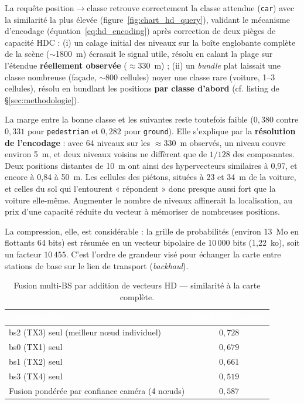 \documentclass[12pt,a4paper,titlepage]{article}
\newcommand{\hd}[1]{\textcolor{white}{\textbf{#1}}}
\begin{document}
La requête position$\to$classe retrouve correctement la classe attendue (\texttt{car}) avec la similarité la plus élevée (figure~\ref{fig:chart_hd_query}), validant le mécanisme d'encodage (équation~\eqref{eq:hd_encoding}) après correction de deux pièges de capacité HDC : (i) un calage initial des niveaux sur la boîte englobante complète de la scène ($\sim$1800~m) écrasait le signal utile, résolu en calant la plage sur l'étendue \textbf{réellement observée} ($\approx$330~m) ; (ii) un \textit{bundle} plat laissait une classe nombreuse (façade, $\sim$800 cellules) noyer une classe rare (voiture, 1--3 cellules), résolu en bundlant les positions \textbf{par classe d'abord} (cf. listing de \S\ref{sec:methodologie}).

La marge entre la bonne classe et les suivantes reste toutefois faible ($0{,}380$ contre $0{,}331$ pour \texttt{pedestrian} et $0{,}282$ pour \texttt{ground}). Elle s'explique par la \textbf{résolution de l'encodage} : avec 64 niveaux sur les $\approx 330$~m observés, un niveau couvre environ 5~m, et deux niveaux voisins ne diffèrent que de $1/128$ des composantes. Deux positions distantes de 10~m ont ainsi des hypervecteurs similaires à 0,97, et encore à 0,84 à 50~m. Les cellules des piétons, situées à 23 et 34~m de la voiture, et celles du sol qui l'entourent « répondent » donc presque aussi fort que la voiture elle-même. Augmenter le nombre de niveaux affinerait la localisation, au prix d'une capacité réduite du vecteur à mémoriser de nombreuses positions.

La compression, elle, est considérable : la grille de probabilités (environ 13~Mo en flottants 64 bits) est résumée en un vecteur bipolaire de 10\,000 bits (1,22~ko), soit un facteur $10\,455$. C'est l'ordre de grandeur visé pour échanger la carte entre stations de base sur le lien de transport (\textit{backhaul}).

\begin{table}[H]
    \centering
    \caption{Fusion multi-BS par addition de vecteurs HD --- similarité à la carte complète.}
    \begin{tabular}{lc}
        \toprule
        \rowcolor{tabhead}
        \hd{Configuration} & \hd{Similarité cosinus} \\
        \midrule
        bs2 (TX3) seul (meilleur n\oe ud individuel) & $0{,}728$ \\
        bs0 (TX1) seul & $0{,}679$ \\
        bs1 (TX2) seul & $0{,}661$ \\
        bs3 (TX4) seul & $0{,}519$ \\
        Fusion pondérée par confiance caméra (4 n\oe uds) & $0{,}587$ \\
        \bottomrule
    \end{tabular}
\end{table}
\end{document}
